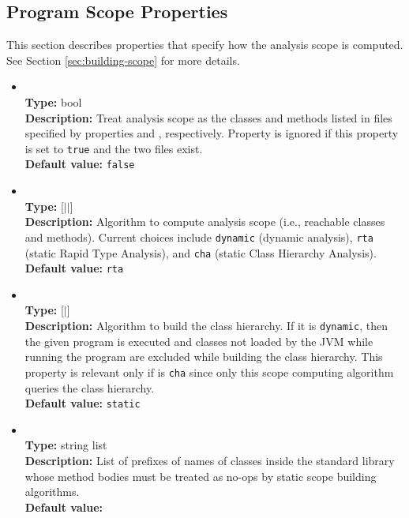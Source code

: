 \subsection{Program Scope Properties}

This section describes properties that specify how the analysis scope is computed.
See Section \ref{sec:building-scope} for more details.

\begin{itemize}
\item
{} \\
{\bf Type:} bool \\
{\bf Description:} Treat analysis scope as the classes and methods listed in files specified by properties  and , respectively.  Property  is ignored if this property is set to {\tt true} and the two files exist. \\
{\bf Default value:} {\tt false}

\item
{} \\
{\bf Type:} [$|$$|$] \\
{\bf Description:} Algorithm to compute analysis scope (i.e., reachable classes and methods).  Current choices include {\tt dynamic} (dynamic analysis), {\tt rta} (static Rapid Type Analysis), and {\tt cha} (static Class Hierarchy Analysis). \\
{\bf Default value:} {\tt rta}

\item
{} \\
{\bf Type:} [$|$] \\
{\bf Description:} Algorithm to build the class hierarchy.  If it is {\tt dynamic}, then the given program is executed and classes not loaded by the JVM while running the program are excluded while building the class hierarchy.  This property is relevant only if  is {\tt cha} since only this scope computing algorithm queries the class hierarchy. \\
{\bf Default value:} {\tt static} 


\item
{} \\
{\bf Type:} string list \\
{\bf Description:} List of prefixes of names of classes inside the standard library whose method bodies must be treated as no-ops by static scope building algorithms. \\
{\bf Default value:} 


\end{itemize}
